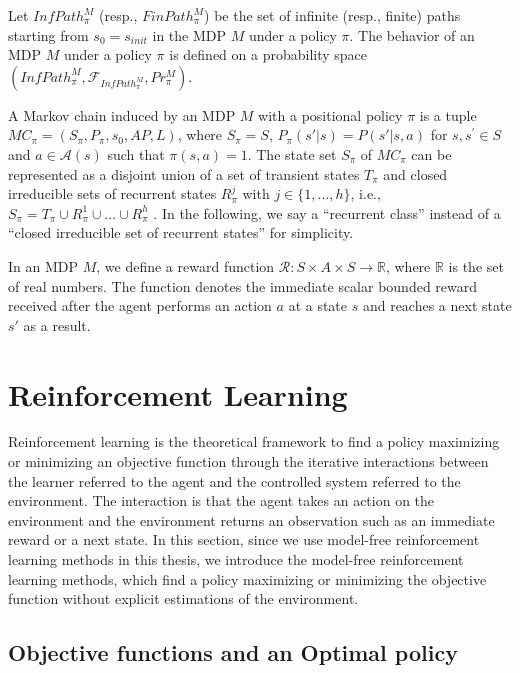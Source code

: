 Let $InfPath^{M}_{\pi}$ (resp., $FinPath^{M}_{\pi}$) be the set of infinite (resp., finite) paths starting from $s_0=s_{init}$ in the MDP $M$ under a policy $\pi$. The behavior of an MDP $M$ under a policy $\pi$ is defined on a probability space $(InfPath^{M}_{\pi}, \mathcal{F}_{InfPath^{M}_{\pi}}, Pr^{M}_{\pi})$. %

\begin{definition}
  A Markov chain induced by an MDP $M$ with a positional policy $\pi$ is a tuple $MC_{\pi} = (S_{\pi},P_{\pi},s_0,AP,L)$, where $S_{\pi} = S$, $P_{\pi}(s'|s) = P(s'|s,a)$ for $s, s^{\prime} \in S$ and $a \in \mathcal{A}(s)$ such that $\pi(s,a) = 1$.
  The state set $S_{\pi}$ of $MC_{\pi}$ can be represented as a disjoint union of a set of transient states $T_{\pi}$ and closed irreducible sets of recurrent states $R^j_{\pi}$ with $j \in \{ 1, \ldots ,h \}$, i.e., $ S_{\pi} = T_{\pi} \cup R^1_{\pi} \cup \ldots \cup R^h_{\pi} $ \cite{ESS}.
  In the following, we say a ``recurrent class'' instead of a ``closed irreducible set of recurrent states'' for simplicity.
\end{definition}

In an MDP $M$, we define a reward function $\mathcal{R}:S \times A \times S \rightarrow \mathbb{R}$, where $\mathbb{R}$ is the set of real numbers. The function denotes the immediate scalar bounded reward received after the agent performs an action $a$ at a state $s$ and reaches a next state $s'$ as a result.

\section{Reinforcement Learning}

Reinforcement learning is the theoretical framework to find a policy maximizing or minimizing an objective function through the iterative interactions between the learner referred to the agent and the controlled system referred to the environment. The interaction is that the agent takes an action on the environment and the environment returns an observation such as an immediate reward or a next state. In this section, since we use model-free reinforcement learning methods in this thesis, we introduce the model-free reinforcement learning methods, which find a policy maximizing or minimizing the objective function without explicit estimations of the environment.

\subsection{Objective functions and an Optimal policy}

